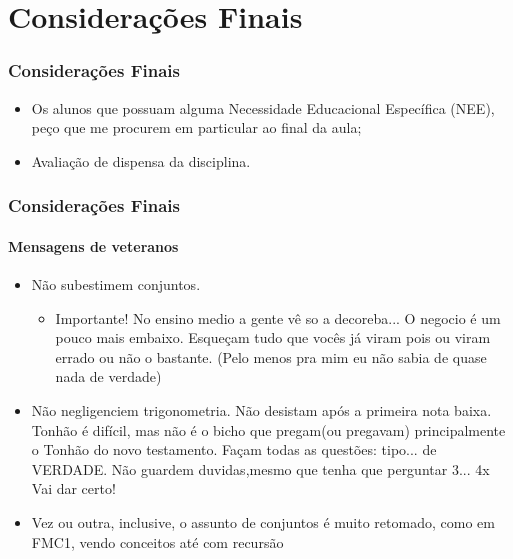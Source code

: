 \section{Considerações Finais}


\begin{frame}
	\frametitle{Considerações Finais}
	
	\begin{itemize}
		\item Os alunos que possuam alguma Necessidade Educacional Específica (NEE), peço que me procurem em particular ao final da aula; \pause
		\item Avaliação de dispensa da disciplina.
	\end{itemize}

\end{frame}


\begin{frame}
	\frametitle{Considerações Finais}
	\framesubtitle{Mensagens de veteranos}

	\begin{itemize}
		\item Não subestimem conjuntos.\begin{itemize}
			\item Importante! No ensino medio a gente vê so a decoreba... O negocio é um pouco mais embaixo. Esqueçam tudo que vocês já viram pois ou viram errado ou não o bastante. (Pelo menos pra mim eu não sabia de quase nada de verdade)
		\end{itemize}
		\item Não negligenciem trigonometria. 
		Não desistam após a primeira nota baixa.
		Tonhão é difícil, mas não é o bicho que pregam(ou pregavam) principalmente o Tonhão do novo testamento.
		Façam todas as questões: tipo... de VERDADE. 
		Não guardem duvidas,mesmo que tenha que perguntar 3... 4x 
		Vai dar certo!
		\item Vez ou outra, inclusive, o assunto de conjuntos é muito retomado, como em FMC1, vendo conceitos até com recursão
	\end{itemize}

\end{frame}


